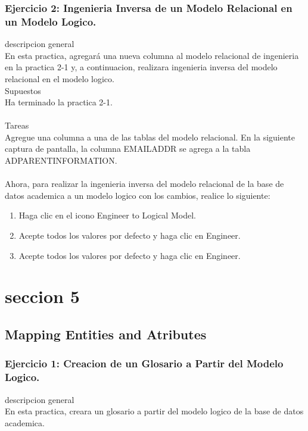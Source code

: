 \documentclass[12pt,letterpaper]{article}
\begin{document}
\subsubsection{Ejercicio 2: Ingenieria Inversa de un Modelo Relacional en un Modelo Logico.} 
descripcion general  \\
En esta practica, agregará una nueva columna al modelo relacional de ingenieria en la practica 2-1 y, a continuacion, realizara ingenieria inversa del modelo relacional en el modelo logico. \\
Supuestos\\
Ha terminado la practica 2-1.\\
\\
Tareas\\
Agregue una columna a una de las tablas del modelo relacional. En la siguiente captura de pantalla, la columna EMAILADDR se agrega a la tabla ADPARENTINFORMATION.
\\
\\
Ahora, para realizar la ingenieria inversa del modelo relacional de la base de datos academica a un modelo logico con los cambios, realice lo siguiente: \\
\begin{enumerate}[1.]
    \item  Haga clic en el icono Engineer to Logical Model. 
     
    \item Acepte todos los valores por defecto y haga clic en Engineer.
    
    \item Acepte todos los valores por defecto y haga clic en Engineer.
    
    
		\end{enumerate}






 \newpage
\section{seccion 5} 
\subsection{Mapping Entities and Atributes}
\subsubsection{Ejercicio 1: Creacion de un Glosario a Partir del Modelo Logico.} 
descripcion general  \\
En esta practica, creara un glosario a partir del modelo logico de la base de datos academica. \\
\end{document}
